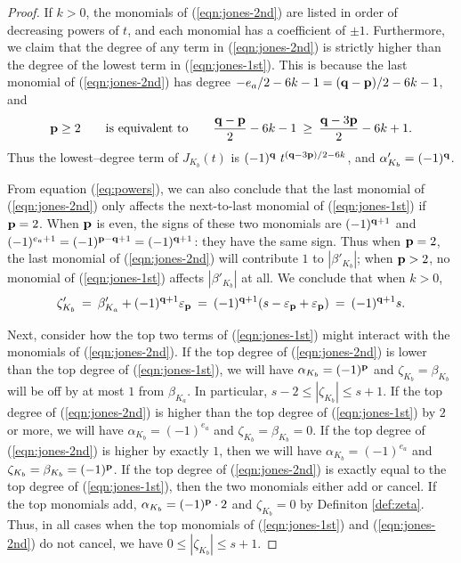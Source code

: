\documentclass[11pt]{amsart}
\newcommand{\abs}[1]{{\left\vert #1 \right\vert}}
\newcommand{\p}{{\bf p}}
\newcommand{\q}{{\bf q}}
\newcommand{\ep}{\varepsilon_{\p}}
\theoremstyle{plain}
\theoremstyle{definition}
\begin{document}
\begin{proof}
If $k > 0$, the monomials of (\ref{eqn:jones-2nd}) are listed in order of decreasing powers of $t$, and each monomial has a  coefficient of $\pm 1$. Furthermore, we claim that the degree of any term in (\ref{eqn:jones-2nd}) is strictly higher than the degree of the lowest term in (\ref{eqn:jones-1st}). This is because the last monomial of (\ref{eqn:jones-2nd}) has degree $-e_a/2-6k-1 = (\q-\p)/2 - 6k -1$, and 
\begin{equation}\label{eq:powers}
\p \geq 2 \qquad \mbox{is equivalent to} \qquad   \frac{\q-\p}{2} - 6k -1 \: \geq \: \frac{\q-3\p}{2} - 6k +1.
\end{equation}
Thus the lowest--degree term of $J_{K_b}(t)$ is $ (-1)^{\q} \ t^{(\q-3\p)/2-6k}$, and $\alpha'_{K_b} = (-1)^{\q}$.

From equation (\ref{eq:powers}), we can also conclude that the last monomial of (\ref{eqn:jones-2nd}) only affects the next-to-last monomial of (\ref{eqn:jones-1st})  if $\p=2$. When $\p$ is even, the signs of these two monomials are $(-1)^{\q +1}$ and $(-1)^{e_a + 1} = (-1)^{\p - \q + 1} = (-1)^{\q + 1}$: they have the same sign. Thus when $\p = 2$, the last monomial of (\ref{eqn:jones-2nd}) will contribute $1$ to $|\beta'_{K_b}|$; when $\p > 2$, no monomial of (\ref{eqn:jones-1st}) affects $|\beta'_{K_b}|$ at all. We conclude that when $k >0$,
$$\zeta'_{K_b} \: = \: \beta'_{K_a} + (-1)^{\q + 1}\ep \: = \: (-1)^{\q + 1} (s - \ep + \ep) \: = \: (-1)^{\q + 1} s.$$

Next, consider how the top two terms of (\ref{eqn:jones-1st}) might interact with the monomials of (\ref{eqn:jones-2nd}). If the top degree of (\ref{eqn:jones-2nd}) is lower than the top degree of (\ref{eqn:jones-1st}), we will have $\alpha_{K_b} = (-1)^{\p}$ and $\zeta_{K_b} = \beta_{K_b}$ will be off by at most $1$ from $\beta_{K_a}$. In particular, $s-2 \leq \abs{\zeta_{K_b}} \leq s+1$. If the top degree of (\ref{eqn:jones-2nd}) is higher than the top degree of (\ref{eqn:jones-1st}) by $2$ or more, we will have $\alpha_{K_b} = (-1)^{e_a}$ and $\zeta_{K_b} = \beta_{K_b} = 0$. If the top degree of (\ref{eqn:jones-2nd}) is higher by exactly $1$, then we will have $\alpha_{K_b} = (-1)^{e_a}$ and $\zeta_{K_b} = \beta_{K_b} = (-1)^\p$. If the top degree of (\ref{eqn:jones-2nd}) is exactly equal to the top degree of (\ref{eqn:jones-1st}), then the two monomials either add or cancel. If the top monomials add, $\alpha_{K_b} = (-1)^\p \cdot 2$ and $\zeta_{K_b} = 0$ by Definiton \ref{def:zeta}. Thus, in all cases when the top monomials of  (\ref{eqn:jones-1st}) and (\ref{eqn:jones-2nd}) do not cancel, we have $0 \leq \abs{\zeta_{K_b}} \leq s+1$.


\end{proof}
\end{document}
